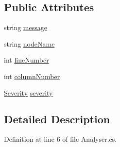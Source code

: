 \subsection*{Public Attributes}
\begin{DoxyCompactItemize}
\item 
string \hyperlink{a00081_ac7ed070dddd2613c08e7874ea5afb3af}{message}
\item 
string \hyperlink{a00081_a662aca4ad2af5116c2cf6773daf1a847}{node\-Name}
\item 
int \hyperlink{a00081_a0bd73f1c684bfd66ae7b6bef8f2972d0}{line\-Number}
\item 
int \hyperlink{a00081_a658e7fb05555c0f9ab5f80057bdc1408}{column\-Number}
\item 
\hyperlink{a00081_a227813cbc8fa03c3448a612ffc909d1c}{Severity} \hyperlink{a00081_ad90ffa839ce0f568a099bb37b4a6c4da}{severity}
\end{DoxyCompactItemize}


\subsection{Detailed Description}


Definition at line 6 of file Analyser.\-cs.



